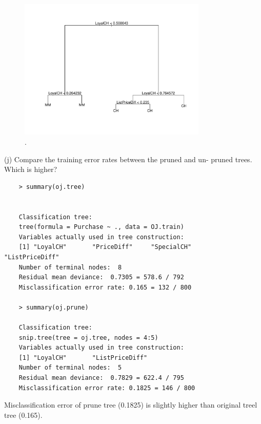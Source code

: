 \documentclass{article}
\begin{document}
\begin{figure}[htb]
	\begin{center}
		\includegraphics[width=0.8\textwidth]{MTH522_hw7_p3i.pdf}
	\end{center}
	\caption{.}
	\label{fig:MTH522_hw7_p3i}
\end{figure}


\newpage

(j) Compare the training error rates between the pruned and un- pruned trees. Which is higher?\\

\begin{program}
	\begin{verbatim}
	> summary(oj.tree)
	
	
	Classification tree:
	tree(formula = Purchase ~ ., data = OJ.train)
	Variables actually used in tree construction:
	[1] "LoyalCH"       "PriceDiff"     "SpecialCH"     "ListPriceDiff"
	Number of terminal nodes:  8 
	Residual mean deviance:  0.7305 = 578.6 / 792 
	Misclassification error rate: 0.165 = 132 / 800 
	
	> summary(oj.prune)
	
	Classification tree:
	snip.tree(tree = oj.tree, nodes = 4:5)
	Variables actually used in tree construction:
	[1] "LoyalCH"       "ListPriceDiff"
	Number of terminal nodes:  5 
	Residual mean deviance:  0.7829 = 622.4 / 795 
	Misclassification error rate: 0.1825 = 146 / 800 	
	\end{verbatim}
\end{program}

Misclassification error of prune tree (0.1825) is slightly higher than original treel tree (0.165). \\
\end{document}
